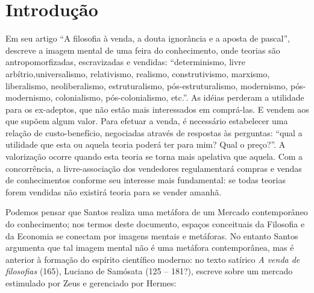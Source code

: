 \chapter*{Introdução} 


Em seu artigo ``A filosofia à venda, a douta ignorância e a aposta de pascal'',  descreve a imagem mental de uma feira do conhecimento, onde teorias  são antropomorfizadas, escravizadas e vendidas: ``determinismo, livre arbítrio,universalismo, relativismo, realismo, construtivismo, marxismo, liberalismo, neoliberalismo, estruturalismo, pós-estruturalismo, modernismo, pós-modernismo, colonialismo, pós-colonialismo, etc.''. As idéias perderam a utilidade para os ex-adeptos, que não estão mais interessados em comprá-las. E vendem aos que supõem algum valor. Para efetuar a venda, é necessário estabelecer uma relação de custo-benefício, negociadas através de respostas às perguntas: ``qual a utilidade que esta ou aquela teoria poderá ter para mim? Qual o preço?''. A valorização ocorre quando esta teoria se torna mais apelativa que aquela. Com a concorrência, a livre-associação dos vendedores regulamentará compras e vendas de conhecimentos conforme seu interesse mais fundamental: se todas teorias forem vendidas não existirá teoria para se vender amanhã. 

Podemos pensar que Santos realiza uma  metáfora de um Mercado contemporâneo do conhecimento; nos termos deste documento, espaços conceituais da Filosofia e da Economia se conectam por imagens mentais e metáforas. No entanto Santos argumenta que tal imagem mental não é uma metáfora contemporânea, mas é anterior à formação do espírito científico moderno: no texto satírico \emph{A venda de filosofias} (165), Luciano de Samósata (125 -- 181?), escreve sobre um mercado estimulado por Zeus e gerenciado por Hermes:

